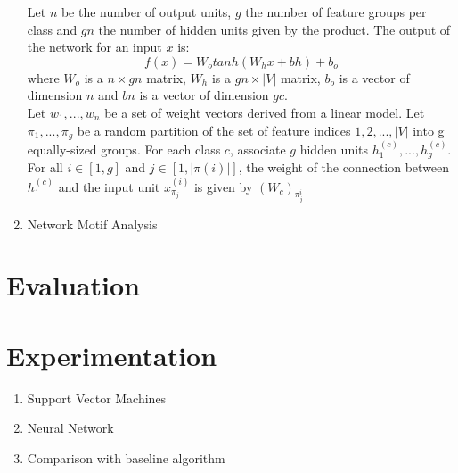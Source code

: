 \documentclass [a4paper, 11pt, oneside, final]{article}
\numberwithin{equation}{section}		%
\numberwithin{figure}{section}			%
\numberwithin{table}{section}				%
\begin{document}
\begin{enumerate}
Let $n$ be the number of output units, $g$ the number of feature groups per class and $gn$ the number of hidden units given by the product.
The output of the network for an input $x$ is:
$$ f(x) = W_{o}tanh(W_{h}x + bh) + b_{o}$$ where $W_{o}$ is a $n \times gn$ matrix, $W_{h}$ is a $gn \times |V|$ matrix, $b_{o}$ is a vector of dimension
$n$ and $bn$ is a vector of dimension $gc$.\\
Let ${w_{1}, . . . , w_{n}}$ be a set of weight vectors derived from a linear model. Let ${\pi_{1}, . . . , \pi_{g}}$ be a random partition of the set of feature indices ${1, 2, . . . , |V |}$  into g equally-sized groups. For each class $c$, associate $g$ hidden units ${h_{1}^{(c)}, . . . , h_{g}^{(c)}}$.
 For all $i \in [1, g]$ and $j \in [1, |\pi(i) |]$, the weight of the connection between $h_{1}^{(c)}$ and the input unit $x_{\pi_{j}}^{(i)} $ is given by $(W_{c})_{\pi_{j}^{i}}$
 
 \item Network Motif Analysis
\end{enumerate}

\section{Evaluation}

\section{Experimentation}
\begin{enumerate}
\item Support Vector Machines
\item Neural Network
\item Comparison with baseline algorithm 
\end{enumerate}
	
\end{document}
